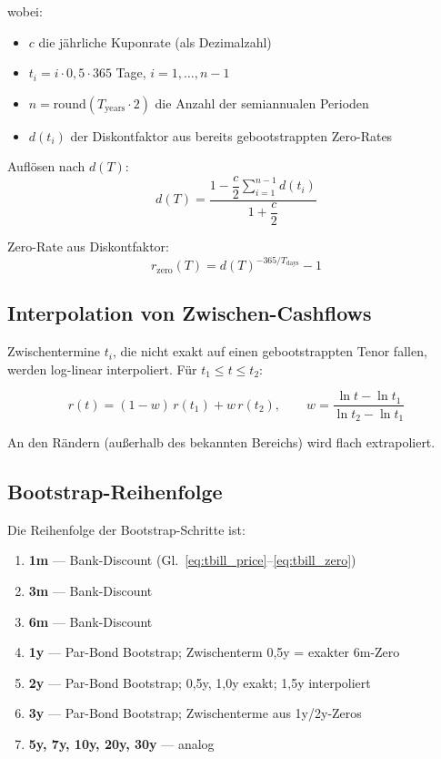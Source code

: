 \documentclass[11pt, a4paper]{article}
\begin{document}
wobei:
\begin{itemize}
  \item $c$ die jährliche Kuponrate (als Dezimalzahl)
  \item $t_i = i \cdot 0{,}5 \cdot 365$ Tage, $i = 1, \ldots, n{-}1$
  \item $n = \mathrm{round}(T_{\mathrm{years}} \cdot 2)$ die Anzahl der semiannualen Perioden
  \item $d(t_i)$ der Diskontfaktor aus bereits gebootstrappten Zero-Rates
\end{itemize}

Auflösen nach $d(T)$:
\begin{equation}
  d(T) = \frac{1 - \dfrac{c}{2} \displaystyle\sum_{i=1}^{n-1} d(t_i)}{1 + \dfrac{c}{2}}
  \label{eq:solve_dT}
\end{equation}

Zero-Rate aus Diskontfaktor:
\begin{equation}
  r_{\mathrm{zero}}(T) = d(T)^{-365/T_{\mathrm{days}}} - 1
  \label{eq:zero_from_d}
\end{equation}

\subsection{Interpolation von Zwischen-Cashflows}

Zwischentermine $t_i$, die nicht exakt auf einen gebootstrappten Tenor
fallen, werden log-linear interpoliert. Für $t_1 \leq t \leq t_2$:

\begin{equation}
  r(t) = (1-w)\,r(t_1) + w\,r(t_2),
  \qquad
  w = \frac{\ln t - \ln t_1}{\ln t_2 - \ln t_1}
  \label{eq:loglin}
\end{equation}

An den Rändern (außerhalb des bekannten Bereichs) wird flach
extrapoliert.

\subsection{Bootstrap-Reihenfolge}

Die Reihenfolge der Bootstrap-Schritte ist:

\begin{enumerate}
  \item \textbf{1m} --- Bank-Discount (Gl.~\ref{eq:tbill_price}--\ref{eq:tbill_zero})
  \item \textbf{3m} --- Bank-Discount
  \item \textbf{6m} --- Bank-Discount
  \item \textbf{1y} --- Par-Bond Bootstrap; Zwischenterm 0,5y = exakter 6m-Zero
  \item \textbf{2y} --- Par-Bond Bootstrap; 0,5y, 1,0y exakt; 1,5y interpoliert
  \item \textbf{3y} --- Par-Bond Bootstrap; Zwischenterme aus 1y/2y-Zeros
  \item \textbf{5y, 7y, 10y, 20y, 30y} --- analog
\end{enumerate}
\end{document}
